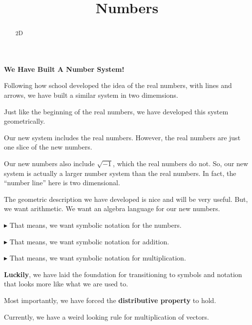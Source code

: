 \documentclass{ximera}
\title{Numbers}
\begin{document}
\begin{abstract}
2D
\end{abstract}
\maketitle





\begin{center}
\textbf{\textcolor{blue!55!black}{We Have Built A Number System!}} 
\end{center}


Following how school developed the idea of the real numbers, with lines and arrows, we have built a similar system in two dimemsions.



Just like the beginning of the real numbers, we have developed this system geometrically.  


Our new system includes the real numbers.  However, the real numbers are just one slice of the new numbers. 

Our new numbers also include $\sqrt{-1}$, which the real numbers do not.  So, our new system is actually a larger number system than the real numbers.  In fact, the ``number line'' here is two dimensional.








The geometric description we have developed is nice and will be very useful.  But, we want arithmetic. We want an algebra language for our new numbers.


\textbf{\textcolor{blue!55!black}{$\blacktriangleright$}} That means, we want symbolic notation for the numbers. 

\textbf{\textcolor{blue!55!black}{$\blacktriangleright$}} That means, we want symbolic notation for addition. 

\textbf{\textcolor{blue!55!black}{$\blacktriangleright$}} That means, we want symbolic notation for multiplication. 



\textbf{\textcolor{red!70!black}{Luckily}}, we have laid the foundation for transitioning to symbols and notation that looks more like what we are used to.   

Most importantly, we have forced the \textbf{\textcolor{purple!85!blue}{distributive property}} to hold.




Currently, we have a weird looking rule for multiplication of vectors.
\end{document}
